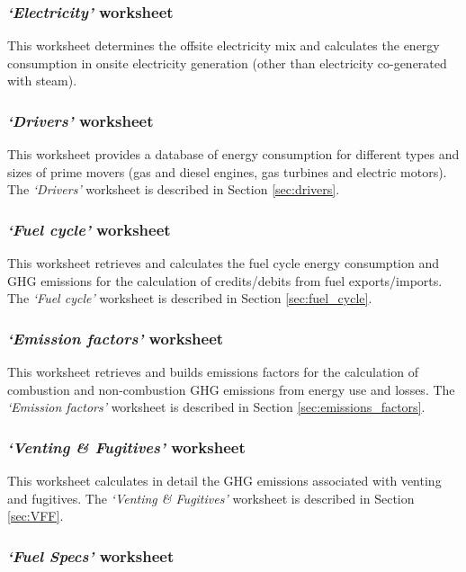 \documentclass[11pt]{report}
\newcommand{\sheet}[1]{\textit{`{#1}'}}
\begin{document}
\subsubsection{\sheet{Electricity} worksheet}

This worksheet determines the offsite electricity mix and calculates the energy consumption in onsite electricity generation (other than electricity co-generated with steam).

\subsubsection{\sheet{Drivers} worksheet} 

This worksheet provides a database of energy consumption for different types and sizes of prime movers (gas and diesel engines, gas turbines and electric motors). The \sheet{Drivers} worksheet is described in Section \ref{sec:drivers}.

\subsubsection{\sheet{Fuel cycle} worksheet}

This worksheet retrieves and calculates the fuel cycle energy consumption and GHG emissions for the calculation of credits/debits from fuel exports/imports. The \sheet{Fuel cycle} worksheet is described in Section \ref{sec:fuel_cycle}.

\subsubsection{\sheet{Emission factors} worksheet} 

This worksheet retrieves and builds emissions factors for the calculation of combustion and non-combustion GHG emissions from energy use and losses. The \sheet{Emission factors} worksheet is described in Section \ref{sec:emissions_factors}.

\subsubsection{\sheet{Venting \& Fugitives} worksheet} 

This worksheet calculates in detail the GHG emissions associated with venting and fugitives. The \sheet{Venting \& Fugitives} worksheet is described in Section \ref{sec:VFF}.

\subsubsection{\sheet{Fuel Specs} worksheet}
\end{document}
